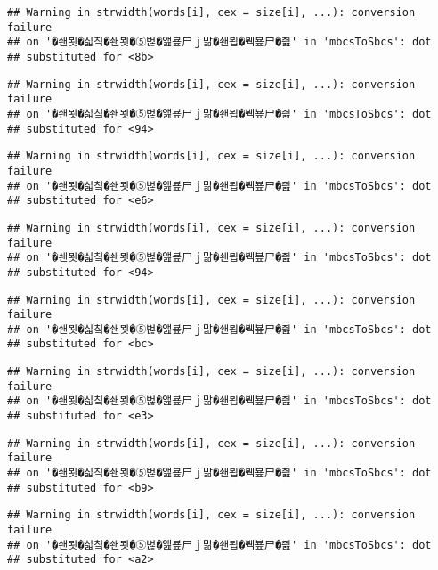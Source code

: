 \documentclass[]{article}
\begin{document}
\begin{verbatim}
## Warning in strwidth(words[i], cex = size[i], ...): conversion failure
## on '�쇈묏�싧칰�쇈묏�⑤벊�앮뵾尸ｊ맒�쇈묍�붹뵾尸�즲' in 'mbcsToSbcs': dot
## substituted for <8b>
\end{verbatim}

\begin{verbatim}
## Warning in strwidth(words[i], cex = size[i], ...): conversion failure
## on '�쇈묏�싧칰�쇈묏�⑤벊�앮뵾尸ｊ맒�쇈묍�붹뵾尸�즲' in 'mbcsToSbcs': dot
## substituted for <94>
\end{verbatim}

\begin{verbatim}
## Warning in strwidth(words[i], cex = size[i], ...): conversion failure
## on '�쇈묏�싧칰�쇈묏�⑤벊�앮뵾尸ｊ맒�쇈묍�붹뵾尸�즲' in 'mbcsToSbcs': dot
## substituted for <e6>
\end{verbatim}

\begin{verbatim}
## Warning in strwidth(words[i], cex = size[i], ...): conversion failure
## on '�쇈묏�싧칰�쇈묏�⑤벊�앮뵾尸ｊ맒�쇈묍�붹뵾尸�즲' in 'mbcsToSbcs': dot
## substituted for <94>
\end{verbatim}

\begin{verbatim}
## Warning in strwidth(words[i], cex = size[i], ...): conversion failure
## on '�쇈묏�싧칰�쇈묏�⑤벊�앮뵾尸ｊ맒�쇈묍�붹뵾尸�즲' in 'mbcsToSbcs': dot
## substituted for <bc>
\end{verbatim}

\begin{verbatim}
## Warning in strwidth(words[i], cex = size[i], ...): conversion failure
## on '�쇈묏�싧칰�쇈묏�⑤벊�앮뵾尸ｊ맒�쇈묍�붹뵾尸�즲' in 'mbcsToSbcs': dot
## substituted for <e3>
\end{verbatim}

\begin{verbatim}
## Warning in strwidth(words[i], cex = size[i], ...): conversion failure
## on '�쇈묏�싧칰�쇈묏�⑤벊�앮뵾尸ｊ맒�쇈묍�붹뵾尸�즲' in 'mbcsToSbcs': dot
## substituted for <b9>
\end{verbatim}

\begin{verbatim}
## Warning in strwidth(words[i], cex = size[i], ...): conversion failure
## on '�쇈묏�싧칰�쇈묏�⑤벊�앮뵾尸ｊ맒�쇈묍�붹뵾尸�즲' in 'mbcsToSbcs': dot
## substituted for <a2>
\end{verbatim}
\end{document}
